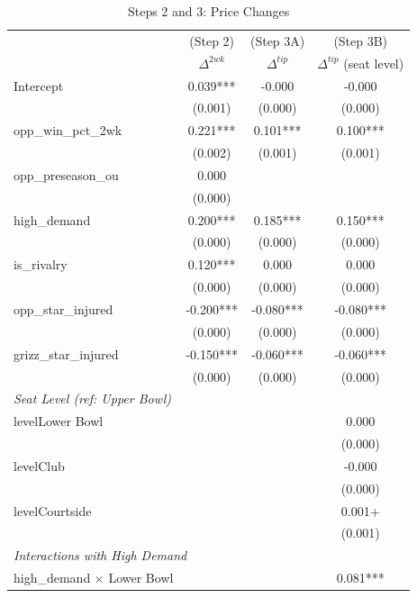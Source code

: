 \documentclass[12pt]{article}
\begin{document}
\begin{table}[h!]
\small
\centering
\caption{Steps 2 and 3: Price Changes}
\begin{tabular}{lccc}
\toprule
 & (Step 2) & (Step 3A) & (Step 3B) \\
 & $\Delta^{2wk}$ & $\Delta^{tip}$ & $\Delta^{tip}$ (seat level) \\
\midrule
Intercept          & 0.039***  & -0.000    &  -0.000   \\
                   & (0.001)   & (0.000)   &  (0.000)  \\
opp\_win\_pct\_2wk & 0.221***  & 0.101***  &  0.100*** \\
                   & (0.002)   & (0.001)   &  (0.001)  \\
opp\_preseason\_ou & 0.000     &           &           \\
                   & (0.000)   &           &           \\
high\_demand       & 0.200***  & 0.185***  &  0.150*** \\
                   & (0.000)   & (0.000)   &  (0.000)  \\
is\_rivalry        & 0.120***  & 0.000     &  0.000    \\
                   & (0.000)   & (0.000)   &  (0.000)  \\
opp\_star\_injured & -0.200*** & -0.080*** & -0.080*** \\
                   & (0.000)   & (0.000)   &  (0.000)  \\
grizz\_star\_injured & -0.150*** & -0.060*** & -0.060*** \\
                   & (0.000)   & (0.000)   &  (0.000)  \\
\midrule
\multicolumn{4}{l}{\textit{Seat Level (ref: Upper Bowl)}} \\
levelLower Bowl    &           &           &  0.000    \\
                   &           &           &  (0.000)  \\
levelClub          &           &           & -0.000    \\
                   &           &           &  (0.000)  \\
levelCourtside     &           &           &  0.001+   \\
                   &           &           &  (0.001)  \\
\midrule
\multicolumn{4}{l}{\textit{Interactions with High Demand}} \\
high\_demand $\times$ Lower Bowl &  &  & 0.081***  \\

\end{tabular}
\end{table}
\end{document}
